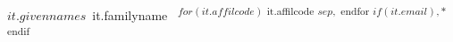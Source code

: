 ${ it.givennames }\,${ it.familyname }\,%
\textsuperscript{${ for(it.affilcode) }${ it.affilcode }${ sep },${ endfor }${ if(it.email) },*${ endif }}%